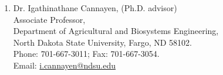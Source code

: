 \documentclass[11pt]{article}
\begin{document}
\begin{enumerate}[itemsep=1em]
\item Dr. Igathinathane Cannayen, (Ph.D. advisor)\\
Associate Professor,\\
Department of Agricultural and Biosystems Engineering,\\
North Dakota State University, Fargo, ND 58102.\\
Phone: 701-667-3011; Fax: 701-667-3054. \\
Email: \url{i.cannayen@ndsu.edu}
%
%
%
%
%
%

\end{enumerate}
\end{document}
